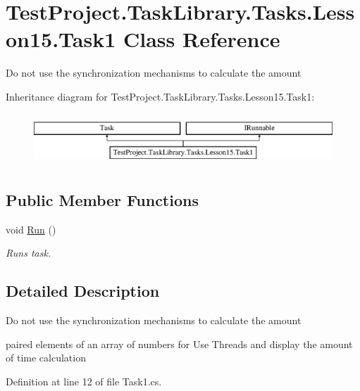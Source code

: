 \hypertarget{class_test_project_1_1_task_library_1_1_tasks_1_1_lesson15_1_1_task1}{}\section{Test\+Project.\+Task\+Library.\+Tasks.\+Lesson15.\+Task1 Class Reference}
\label{class_test_project_1_1_task_library_1_1_tasks_1_1_lesson15_1_1_task1}


Do not use the synchronization mechanisms to calculate the amount  


Inheritance diagram for Test\+Project.\+Task\+Library.\+Tasks.\+Lesson15.\+Task1\+:\begin{figure}[H]
\begin{center}
\leavevmode
\includegraphics[height=1.964912cm]{class_test_project_1_1_task_library_1_1_tasks_1_1_lesson15_1_1_task1}
\end{center}
\end{figure}
\subsection*{Public Member Functions}
\begin{DoxyCompactItemize}
\item 
void \mbox{\hyperlink{class_test_project_1_1_task_library_1_1_tasks_1_1_lesson15_1_1_task1_a42f198f1a19c83fa9d4ce408ebb153cf}{Run}} ()
\begin{DoxyCompactList}\small\item\em Runs task. \end{DoxyCompactList}\end{DoxyCompactItemize}


\subsection{Detailed Description}
Do not use the synchronization mechanisms to calculate the amount 

paired elements of an array of numbers for Use Threads and display the amount of time calculation 

Definition at line 12 of file Task1.\+cs.



